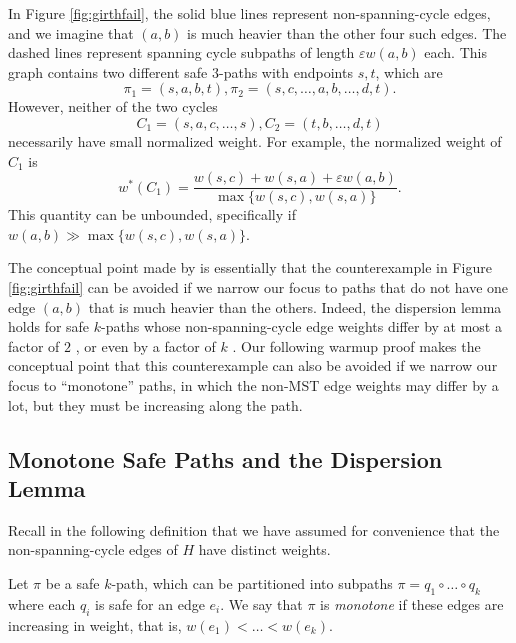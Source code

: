 \documentclass{article}\usepackage[a4paper,margin=20mm]{geometry}
\newcommand{\eps}{\varepsilon}
\begin{document}
In Figure \ref{fig:girthfail}, the solid blue lines represent non-spanning-cycle edges, and we imagine that $(a, b)$ is much heavier than the other four such edges.
The dashed lines represent spanning cycle subpaths of length $\eps w(a, b)$ each.  This graph contains two different safe $3$-paths with endpoints $s, t$, which are
$$\pi_1 = (s, a, b, t), \pi_2 = (s, c, \dots, a, b, \dots, d, t).$$
However, neither of the two cycles
$$C_1 = (s, a, c, \dots, s), C_2 = (t, b, \dots, d, t)$$
necessarily have small normalized weight.
For example, the normalized weight of $C_1$ is
$$w^*(C_1) = \frac{w(s, c) + w(s, a) + \eps w(a, b)}{\max\{w(s, c), w(s, a)\}}.$$
This quantity can be unbounded, specifically if $w(a, b) \gg \max\{w(s, c), w(s, a)\}$.


The conceptual point made by \cite{CDNS95, ENS15} is essentially that the counterexample in Figure \ref{fig:girthfail} can be avoided if we narrow our focus to paths that do not have one edge $(a, b)$ that is much heavier than the others.
Indeed, the dispersion lemma holds for safe $k$-paths whose non-spanning-cycle edge weights differ by at most a factor of $2$ \cite{CDNS95}, or even by a factor of $k$ \cite{ENS15}.
Our following warmup proof makes the conceptual point that this counterexample can also be avoided if we narrow our focus to ``monotone'' paths, in which the non-MST edge weights may differ by a lot, but they must be increasing along the path.

\subsection{Monotone Safe Paths and the Dispersion Lemma}

Recall in the following definition that we have assumed for convenience that the non-spanning-cycle edges of $H$ have distinct weights.

\begin{definition} 
Let $\pi$ be a safe $k$-path, which can be partitioned into subpaths
$\pi = q_1 \circ \dots \circ q_k$
where each $q_i$ is safe for an edge $e_i$.
We say that $\pi$ is \emph{monotone} if these edges are increasing in weight, that is, $w(e_1) < \dots < w(e_k)$.
\end{definition}

\end{document}
